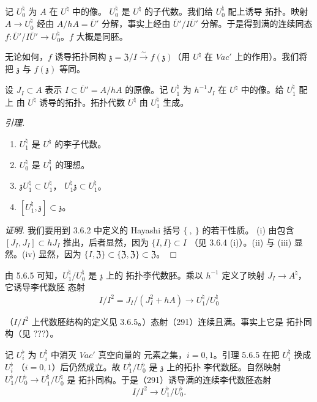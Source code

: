  记 $U^{\natural}_0$ 为 $A$ 在 $U^{\natural}$ 中的像。
$U^{\natural}_0$ 是 $U^{\natural}$ 的子代数。我们给 $U^{\natural}_0$ 配上诱导
拓扑。映射 $A\to U^{\natural}_0$ 经由 $A/hA=\overline{U}'$ 分解，事实上经由
$\overline{U}'/I\overline{U}'$ 分解。于是得到满的连续同态
$f:\overline{U}'/I\overline{U}'\to U^{\natural}_0$。$f$ 大概是同胚。

无论如何，$f$ 诱导拓扑同构
$\mathfrak{z}=\mathfrak{Z}/I\xrightarrow{\sim}f(\mathfrak{z})$（用
$U^{\natural}$ 在 $\mathit{Vac}'$ 上的作用）。我们将把 $\mathfrak{z}$ 与
$f(\mathfrak{z})$ 等同。

 设 $J_I\subset A$ 表示 $I\subset\overline{U}'=A/hA$ 的原像。记
$U^{\natural}_1$ 为 $h^{-1}J_I$ 在 $U^{\natural}$ 中的像。给 $U^{\natural}_1$ 配上
由 $U^{\natural}$ 诱导的拓扑。拓扑代数 $U^{\natural}$ 由 $U^{\natural}_1$ 生成。

 \emph{引理.}
\begin{enumerate}[label=(\roman*),leftmargin=2.2em]
\item $U^{\natural}_1$ 是 $U^{\natural}$ 的李子代数。
\item $U^{\natural}_0$ 是 $U^{\natural}_1$ 的理想。
\item $\mathfrak{z}U^{\natural}_1\subset U^{\natural}_1$，
$U^{\natural}_1\mathfrak{z}\subset U^{\natural}_1$。
\item $[U^{\natural}_1,\mathfrak{z}]\subset\mathfrak{z}$。
\end{enumerate}

\emph{证明.} 我们要用到 3.6.2 中定义的 Hayashi 括号 $\{\ ,\ \}$ 的若干性质。
(i) 由包含 $[J_I,J_I]\subset hJ_I$ 推出，后者显然，因为 $\{I,I\}\subset I$
（见 3.6.4 (i)）。(ii) 与 (iii) 显然。(iv) 显然，因为
$\{I,\mathfrak{Z}\}\subset\{\mathfrak{Z},\mathfrak{Z}\}\subset\mathfrak{Z}$。
\hfill$\Box$

 由 5.6.5 可知，$U^{\natural}_1/U^{\natural}_0$ 是 $\mathfrak{z}$ 上的
拓扑李代数胚。乘以 $h^{-1}$ 定义了映射 $J_I\to A^{\natural}$，它诱导李代数胚
态射
\begin{equation}\tag{291}
I/I^{2}=J_I/(J_I^{2}+hA)\to U^{\natural}_1/U^{\natural}_0
\end{equation}


（$I/I^{2}$ 上代数胚结构的定义见 3.6.5。）态射（291）连续且满。事实上它是
拓扑同构（见 ???）。

 记 $U^{\flat}_i$ 为 $U^{\natural}_i$ 中消灭 $\mathit{Vac}'$ 真空向量的
元素之集，$i=0,1$。引理 5.6.5 在把 $U^{\natural}_i$ 换成 $U^{\flat}_i$
（$i=0,1$）后仍然成立。故 $U^{\flat}_1/U^{\flat}_0$ 是 $\mathfrak{z}$ 上的拓扑
李代数胚。自然映射 $U^{\flat}_1/U^{\flat}_0\to U^{\natural}_1/U^{\natural}_0$ 是
拓扑同构。于是（291）诱导满的连续李代数胚态射
\begin{equation}\tag{292}
I/I^{2}\to U^{\flat}_1/U^{\flat}_0.
\end{equation}

